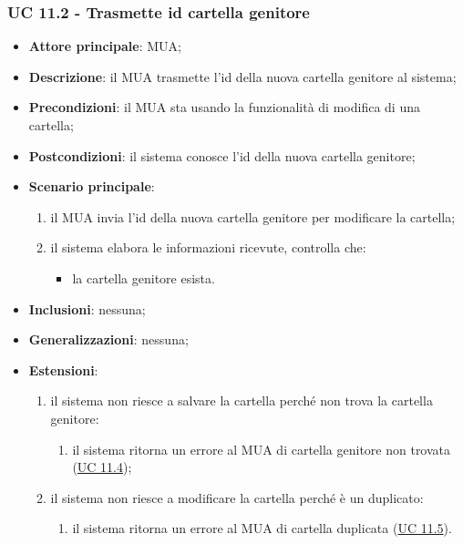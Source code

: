 \subsubsection{UC 11.2 - Trasmette id cartella genitore} \label{sec:UC11.2}
\begin{itemize}
    \item \textbf{Attore principale}: MUA;
    \item \textbf{Descrizione}: il MUA trasmette l'id della nuova cartella genitore al sistema;
    \item \textbf{Precondizioni}: il MUA sta usando la funzionalità di modifica di una cartella;
    \item \textbf{Postcondizioni}: il sistema conosce l'id della nuova cartella genitore;
    \item \textbf{Scenario principale}:
        \begin{enumerate}
            \item il MUA invia l'id della nuova cartella genitore per modificare la cartella;
            \item il sistema elabora le informazioni ricevute, controlla che:
            \begin{itemize}
                \item la cartella genitore esista.
            \end{itemize}
        \end{enumerate}
    \item \textbf{Inclusioni}: nessuna;
    \item \textbf{Generalizzazioni}: nessuna;
    \item \textbf{Estensioni}:
        \begin{enumerate}[label=\alph*.]
            \item il sistema non riesce a salvare la cartella perché non trova la cartella genitore:
            \begin{enumerate}[label=\arabic*.]
                \item il sistema ritorna un errore al MUA di cartella genitore non trovata (\hyperref[sec:UC11.4]{UC 11.4});
            \end{enumerate}
            \item il sistema non riesce a modificare la cartella perché è un duplicato:
            \begin{enumerate}[label=\arabic*.]
                \item il sistema ritorna un errore al MUA di cartella duplicata (\hyperref[sec:UC11.5]{UC 11.5}).
            \end{enumerate}
        \end{enumerate}
\end{itemize}




